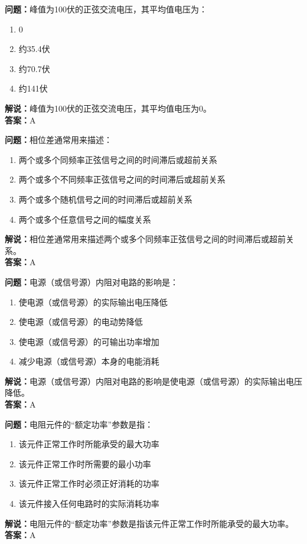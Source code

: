\documentclass{ctexbook}%
\begin{document}
\textbf{问题：}峰值为100伏的正弦交流电压，其平均值电压为：
\begin{enumerate}[label=\Alph*), leftmargin=3em]
\item 0
\item 约35.4伏
\item 约70.7伏
\item 约141伏
\end{enumerate}
\textbf{解说：}峰值为100伏的正弦交流电压，其平均值电压为0。\\
\textbf{答案：}A

\textbf{问题：}相位差通常用来描述：
\begin{enumerate}[label=\Alph*), leftmargin=3em]
\item 两个或多个同频率正弦信号之间的时间滞后或超前关系
\item 两个或多个不同频率正弦信号之间的时间滞后或超前关系
\item 两个或多个随机信号之间的时间滞后或超前关系
\item 两个或多个任意信号之间的幅度关系
\end{enumerate}
\textbf{解说：}相位差通常用来描述两个或多个同频率正弦信号之间的时间滞后或超前关系。\\
\textbf{答案：}A

\textbf{问题：}电源（或信号源）内阻对电路的影响是：
\begin{enumerate}[label=\Alph*), leftmargin=3em]
\item 使电源（或信号源）的实际输出电压降低
\item 使电源（或信号源）的电动势降低
\item 使电源（或信号源）的可输出功率增加
\item 减少电源（或信号源）本身的电能消耗
\end{enumerate}
\textbf{解说：}电源（或信号源）内阻对电路的影响是使电源（或信号源）的实际输出电压降低。\\
\textbf{答案：}A

\textbf{问题：}电阻元件的“额定功率”参数是指：
\begin{enumerate}[label=\Alph*), leftmargin=3em]
\item 该元件正常工作时所能承受的最大功率
\item 该元件正常工作时所需要的最小功率
\item 该元件正常工作时必须正好消耗的功率
\item 该元件接入任何电路时的实际消耗功率
\end{enumerate}
\textbf{解说：}电阻元件的“额定功率”参数是指该元件正常工作时所能承受的最大功率。\\
\textbf{答案：}A
\end{document}
